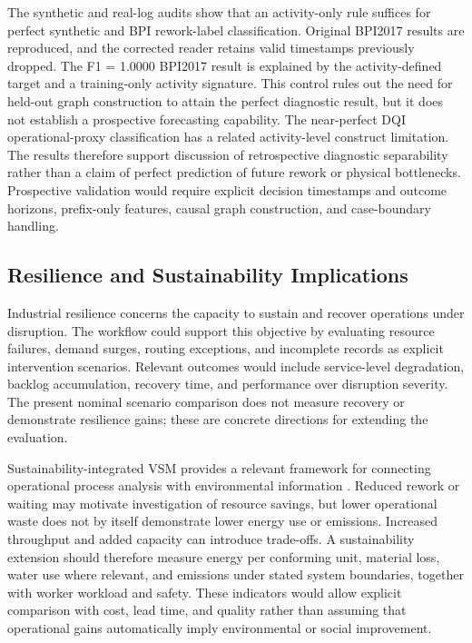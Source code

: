 The synthetic and real-log audits show that an activity-only rule suffices for perfect synthetic and BPI rework-label classification. Original BPI2017 results are reproduced, and the corrected reader retains valid timestamps previously dropped. The F1 = 1.0000 BPI2017 result is explained by the activity-defined target and a training-only activity signature. This control rules out the need for held-out graph construction to attain the perfect diagnostic result, but it does not establish a prospective forecasting capability. The near-perfect DQI operational-proxy classification has a related activity-level construct limitation. The results therefore support discussion of retrospective diagnostic separability rather than a claim of perfect prediction of future rework or physical bottlenecks. Prospective validation would require explicit decision timestamps and outcome horizons, prefix-only features, causal graph construction, and case-boundary handling.

\subsection{Resilience and Sustainability Implications}
\label{subsec:resilience_sustainability}

Industrial resilience concerns the capacity to sustain and recover operations under disruption. The workflow could support this objective by evaluating resource failures, demand surges, routing exceptions, and incomplete records as explicit intervention scenarios. Relevant outcomes would include service-level degradation, backlog accumulation, recovery time, and performance over disruption severity. The present nominal scenario comparison does not measure recovery or demonstrate resilience gains; these are concrete directions for extending the evaluation.

Sustainability-integrated VSM provides a relevant framework for connecting operational process analysis with environmental information \cite{HorsthoferRauch2024SustainabilityVSM}. Reduced rework or waiting may motivate investigation of resource savings, but lower operational waste does not by itself demonstrate lower energy use or emissions. Increased throughput and added capacity can introduce trade-offs. A sustainability extension should therefore measure energy per conforming unit, material loss, water use where relevant, and emissions under stated system boundaries, together with worker workload and safety. These indicators would allow explicit comparison with cost, lead time, and quality rather than assuming that operational gains automatically imply environmental or social improvement.

